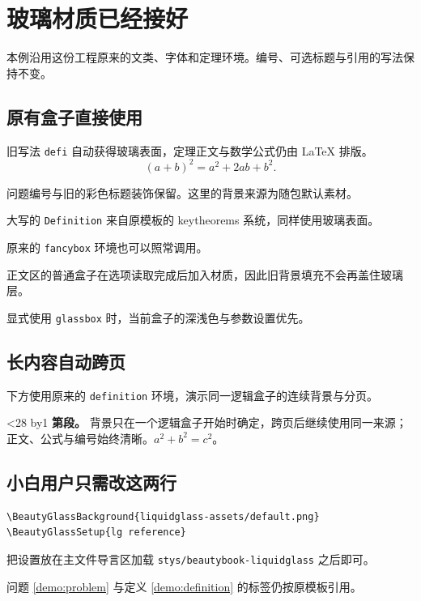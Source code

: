\documentclass[lang=cn,zihao=-4,a4paper,fontset=none]{beautybook}
\begin{document}
\mainmatter
\chapter{玻璃材质已经接好}
本例沿用这份工程原来的文类、字体和定理环境。编号、可选标题与引用的写法保持不变。
\section{原有盒子直接使用}
\begin{defi}[第一套定理]
旧写法 \texttt{defi} 自动获得玻璃表面，定理正文与数学公式仍由 \LaTeX{} 排版。
\[ (a+b)^2=a^2+2ab+b^2. \]
\end{defi}
\begin{problem}
问题编号与旧的彩色标题装饰保留。这里的背景来源为随包默认素材。
\end{problem}
\begin{Definition}[note={第三套定理},label={demo:definition}]
大写的 \texttt{Definition} 来自原模板的 keytheorems 系统，同样使用玻璃表面。
\end{Definition}
\begin{fancybox}
原来的 \texttt{fancybox} 环境也可以照常调用。
\end{fancybox}
\begin{tcolorbox}[title={普通 tcolorbox},arc=3mm,breakable]
正文区的普通盒子在选项读取完成后加入材质，因此旧背景填充不会再盖住玻璃层。
\end{tcolorbox}
\begin{glassbox}[title={逐盒选择深色},lg theme=dark]
显式使用 \texttt{glassbox} 时，当前盒子的深浅色与参数设置优先。
\end{glassbox}
\section{长内容自动跨页}
下方使用原来的 \texttt{definition} 环境，演示同一逻辑盒子的连续背景与分页。
\begin{definition}
\newcount\demoParagraph{}
\loop\ifnum\demoParagraph<28
\advance\demoParagraph by1
\textbf{第\the\demoParagraph 段。} 背景只在一个逻辑盒子开始时确定，跨页后继续使用同一来源；正文、公式与编号始终清晰。\quad $a^2+b^2=c^2$。\par\medskip
\repeat
\end{definition}
\section{小白用户只需改这两行}
\begin{verbatim}
\BeautyGlassBackground{liquidglass-assets/default.png}
\BeautyGlassSetup{lg reference}
\end{verbatim}
把设置放在主文件导言区加载 \texttt{stys/beautybook-liquidglass} 之后即可。\par
问题 \ref{demo:problem} 与定义 \ref{demo:definition} 的标签仍按原模板引用。
\end{document}
